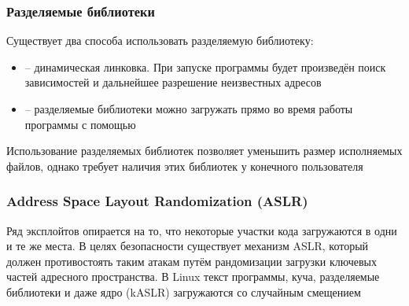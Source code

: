     \subsubsection{Разделяемые библиотеки}
      Существует два способа использовать разделяемую библиотеку:
      \begin{itemize}
        \item {} -- динамическая линковка. При запуске программы будет произведён поиск зависимостей и дальнейшее разрешение неизвестных адресов
        \item {} -- разделяемые библиотеки можно загружать прямо во время работы программы с помощью 
      \end{itemize}
      Использование разделяемых библиотек позволяет уменьшить размер исполняемых файлов, однако требует наличия этих библиотек у конечного пользователя
      
    \subsubsection{Address Space Layout Randomization (ASLR)}
      Ряд эксплойтов опирается на то, что некоторые участки кода загружаются в одни и те же места. В целях безопасности существует механизм ASLR, который должен противостоять таким атакам путём рандомизации загрузки ключевых частей адресного пространства. В Linux текст программы, куча, разделяемые библиотеки и даже ядро (kASLR) загружаются со случайным смещением
